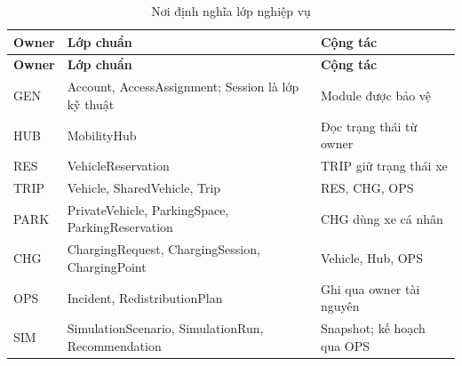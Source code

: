 \begin{longtable}{|L{20mm}|L{75mm}|L{44mm}|}
\caption{Nơi định nghĩa lớp nghiệp vụ}\\\hline
\textbf{Owner} & \textbf{Lớp chuẩn} & \textbf{Cộng tác}\\\hline
\endfirsthead
\hline\textbf{Owner} & \textbf{Lớp chuẩn} & \textbf{Cộng tác}\\\hline\endhead
GEN & Account, AccessAssignment; Session là lớp kỹ thuật & Module được bảo vệ\\\hline
HUB & MobilityHub & Đọc trạng thái từ owner\\\hline
RES & VehicleReservation & TRIP giữ trạng thái xe\\\hline
TRIP & Vehicle, SharedVehicle, Trip & RES, CHG, OPS\\\hline
PARK & PrivateVehicle, ParkingSpace, ParkingReservation & CHG dùng xe cá nhân\\\hline
CHG & ChargingRequest, ChargingSession, ChargingPoint & Vehicle, Hub, OPS\\\hline
OPS & Incident, RedistributionPlan & Ghi qua owner tài nguyên\\\hline
SIM & SimulationScenario, SimulationRun, Recommendation & Snapshot; kế hoạch qua OPS\\\hline
\end{longtable}
